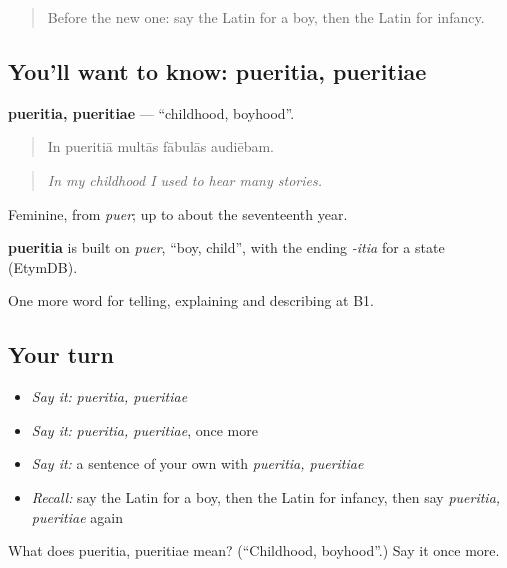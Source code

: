 \begin{quote}
Before the new one: say the Latin for a boy, then the Latin for infancy.
\end{quote}

\subsection*{You'll want to know: pueritia, pueritiae}
\textbf{pueritia, pueritiae} — \textquotedblleft{}childhood, boyhood\textquotedblright{}.

\begin{quote}
In pueritiā multās fābulās audiēbam.
\end{quote}

\begin{quote}
\emph{In my childhood I used to hear many stories.}
\end{quote}

Feminine, from \emph{puer}; up to about the seventeenth year.

\begin{cousinweb}
\textbf{pueritia} is built on \emph{puer}, \textquotedblleft{}boy, child\textquotedblright{}, with the ending \emph{-itia} for a state (EtymDB).
\end{cousinweb}

\begin{grammarlens}[title={What you've built}]
One more word for telling, explaining and describing at B1.
\end{grammarlens}

\subsection*{Your turn}
\begin{itemize}
\raggedright
  \item \emph{Say it:} \emph{pueritia, pueritiae}
  \item \emph{Say it:} \emph{pueritia, pueritiae}, once more
  \item \emph{Say it:} a sentence of your own with \emph{pueritia, pueritiae}
  \item \emph{Recall:} say the Latin for a boy, then the Latin for infancy, then say \emph{pueritia, pueritiae} again
\end{itemize}

\begin{tcolorbox}[breakable,colback=teal!4,colframe=teal!35!black,title={Before you move on}]
What does pueritia, pueritiae mean? (\textquotedblleft{}Childhood, boyhood\textquotedblright{}.) Say it once more.
\end{tcolorbox}
